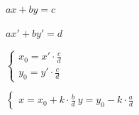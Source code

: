 $ax + by = c$

$ax' + by' = d$

$\begin{cases}x_{0} = x '\cdot\frac{c}{d}\\ y_{0}=y'\cdot\frac{c}{ d }\end{cases}$

$\begin{cases}x = x_{0} + k\cdot\frac{b}{ d }\ y = y_{0} - k\cdot\frac{a}{ d }\end{cases}$